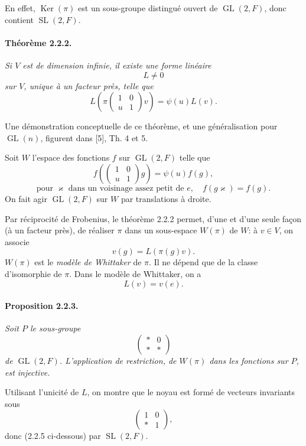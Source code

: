 \documentclass[10pt,a4paper]{article}
\providecommand{\GL}{\operatorname{GL}}
\providecommand{\SL}{\operatorname{SL}}
\providecommand{\Ker}{\operatorname{Ker}}
\begin{document}
\clearpage
{}
\hypertarget{authority-25}{}
En effet, \(\Ker(\pi)\) est un sous-groupe distingué ouvert de \(\GL(2,F)\), donc contient \(\SL(2,F)\).

\paragraph{Théorème 2.2.2.}{\itshape  Si \(V\) est de dimension infinie, il existe une forme linéaire
\[
L\ne0
\]
sur \(V\), unique à un facteur près, telle que
\[
L\!\left(\pi\!\begin{pmatrix}1&0\\u&1\end{pmatrix}v\right)=\psi(u)L(v).
\]
\par}
Une démonstration conceptuelle de ce théorème, et une généralisation pour \(\GL(n)\), figurent dans [5], Th. 4 et 5.

Soit \(W\) l'espace des fonctions \(f\) sur \(\GL(2,F)\) telle que
\[
\tag{a}
f\!\left(\begin{pmatrix}1&0\\u&1\end{pmatrix}g\right)=\psi(u)f(g),
\]
\[
\tag{b}
\text{pour }\varkappa\text{ dans un voisinage assez petit de }e,\quad f(g\varkappa)=f(g).
\]
On fait agir \(\GL(2,F)\) sur \(W\) par translations à droite.

Par réciprocité de Frobenius, le théorème 2.2.2 permet, d'une et d'une seule façon (à un facteur près), de réaliser \(\pi\) dans un sous-espace \(W(\pi)\) de \(W\): à \(v\in V\), on associe
\[
v(g)=L(\pi(g)v).
\]
\(W(\pi)\) est le \emph{modèle de Whittaker} de \(\pi\). Il ne dépend que de la classe d'isomorphie de \(\pi\). Dans le modèle de Whittaker, on a
\[
L(v)=v(e).
\]

\paragraph{Proposition 2.2.3.}{\itshape  Soit \(P\) le sous-groupe
\[
\begin{pmatrix}*&0\\ *&*\end{pmatrix}
\]
de \(\GL(2,F)\). L'application de restriction, de \(W(\pi)\) dans les fonctions sur \(P\), est injective.

\par}
Utilisant l'unicité de \(L\), on montre que le noyau est formé de vecteurs invariants sous
\[
\begin{pmatrix}1&0\\ *&1\end{pmatrix},
\]
donc (2.2.5 ci-dessous) par \(\SL(2,F)\).
\end{document}
